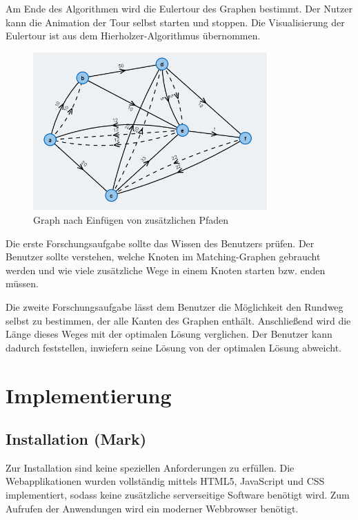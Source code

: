 Am Ende des Algorithmen wird die Eulertour des Graphen bestimmt. Der Nutzer kann die Animation der Tour selbst starten und stoppen. Die Visualisierung der Eulertour ist aus dem Hierholzer-Algorithmus übernommen.

\begin{figure}[h!]
	\centering
	\includegraphics[width=0.8\textwidth]{figures/postman_eulerian}
	\caption[Eulerscher Graph]{Graph nach Einfügen von zusätzlichen Pfaden}\label{fig:postman_eulerian}
\end{figure}

Die erste Forschungsaufgabe sollte das Wissen des Benutzers prüfen. Der Benutzer sollte verstehen, welche Knoten im Matching-Graphen gebraucht werden und wie viele zusätzliche Wege in einem Knoten starten bzw. enden müssen.

Die zweite Forschungsaufgabe lässt dem Benutzer die Möglichkeit den Rundweg selbst zu bestimmen, der alle Kanten des Graphen enthält. Anschließend wird die Länge dieses Weges mit der optimalen Lösung verglichen. Der Benutzer kann dadurch feststellen, inwiefern seine Lösung von der optimalen Lösung abweicht.

\chapter{Implementierung}

\section{Installation (Mark)}
Zur Installation sind keine speziellen Anforderungen zu erfüllen. Die Webapplikationen wurden vollständig mittels HTML5, JavaScript und CSS implementiert, sodass keine zusätzliche serverseitige Software benötigt wird. Zum Aufrufen der Anwendungen wird ein moderner Webbrowser benötigt.

